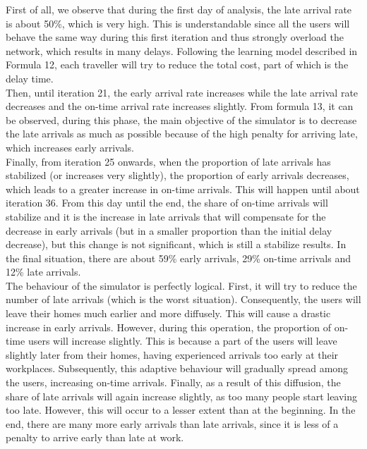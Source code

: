 \documentclass[a4paper, 12pt,oneside]{article}
\begin{document}
First of all, we observe that during the first day of analysis, the late arrival rate is about 50\%, which is very high. This is understandable since all the users will behave the same way during this first iteration and thus strongly overload the network, which results in many delays. Following the learning model described in Formula 12, each traveller will try to reduce the total cost, part of which is the delay time.\\

Then, until iteration 21, the early arrival rate increases while the late arrival rate decreases and the on-time arrival rate increases slightly. From formula 13, it can be observed, during this phase, the main objective of the simulator is to decrease the late arrivals as much as possible because of the high penalty for arriving late, which increases early arrivals.\\

Finally, from iteration 25 onwards, when the proportion of late arrivals has stabilized (or increases very slightly), the proportion of early arrivals decreases, which leads to a greater increase in on-time arrivals. This will happen until about iteration 36. From this day until the end, the share of on-time arrivals will stabilize and it is the increase in late arrivals that will compensate for the decrease in early arrivals (but in a smaller proportion than the initial delay decrease), but this change is not significant, which is still a stabilize results. In the final situation, there are about 59\% early arrivals, 29\% on-time arrivals and 12\% late arrivals.\\

The behaviour of the simulator is perfectly logical. First, it will try to reduce the number of late arrivals (which is the worst situation). Consequently, the users will leave their homes much earlier and more diffusely. This will cause a drastic increase in early arrivals. However, during this operation, the proportion of on-time users will increase slightly. This is because a part of the users will leave slightly later from their homes, having experienced arrivals too early at their workplaces. Subsequently, this adaptive behaviour will gradually spread among the users, increasing on-time arrivals. Finally, as a result of this diffusion, the share of late arrivals will again increase slightly, as too many people start leaving too late. However, this will occur to a lesser extent than at the beginning. In the end, there are many more early arrivals than late arrivals, since it is less of a penalty to arrive early than late at work.
\end{document}
